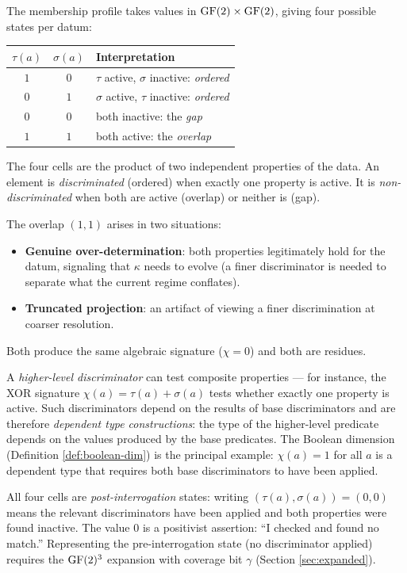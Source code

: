 \begin{remark}
The membership profile takes values in $\operatorname{GF}(2) \times \operatorname{GF}(2)$,
giving four possible states per datum:
\begin{center}
\begin{tabular}{c|c|l}
$\tau(a)$ & $\sigma(a)$ & Interpretation \\
\hline
$1$ & $0$ & $\tau$ active, $\sigma$ inactive: \emph{ordered} \\
$0$ & $1$ & $\sigma$ active, $\tau$ inactive: \emph{ordered} \\
$0$ & $0$ & both inactive: the \emph{gap} \\
$1$ & $1$ & both active: the \emph{overlap}
\end{tabular}
\end{center}
The four cells are the product of two independent
properties of the data. An element is \emph{discriminated}
(ordered) when exactly one property is active. It is
\emph{non-discriminated} when both are active (overlap)
or neither is (gap).

The overlap $(1,1)$ arises in two situations:
\begin{itemize}[nosep]
  \item \textbf{Genuine over-determination}: both
    properties legitimately hold for the datum, signaling
    that $\kappa$ needs to evolve (a finer discriminator
    is needed to separate what the current regime conflates).
  \item \textbf{Truncated projection}: an artifact of
    viewing a finer discrimination at coarser resolution.
\end{itemize}
Both produce the same algebraic signature ($\chi = 0$)
and both are residues.

A \emph{higher-level discriminator} can test composite
properties --- for instance, the XOR signature
$\chi(a) = \tau(a) + \sigma(a)$ tests whether exactly
one property is active. Such discriminators depend on
the results of base discriminators and are therefore
\emph{dependent type constructions}: the type of the
higher-level predicate depends on the values produced
by the base predicates. The Boolean dimension
(Definition \ref{def:boolean-dim}) is the principal
example: $\chi(a) = 1$ for all $a$ is a dependent type
that requires both base discriminators to have been
applied.

All four cells are \emph{post-interrogation} states: writing
$(\tau(a), \sigma(a)) = (0,0)$ means the relevant
discriminators have been applied and both properties were
found inactive. The value $0$ is a positivist assertion:
``I checked and found no match.'' Representing the
pre-interrogation state (no discriminator applied)
requires the $\operatorname{GF}(2)^3$ expansion with coverage bit
$\gamma$ (Section \ref{sec:expanded}).
\end{remark}

